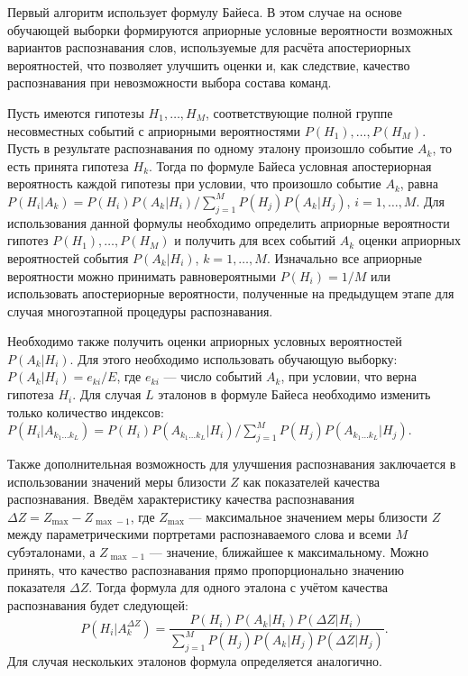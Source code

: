 Первый алгоритм использует формулу Байеса.
В этом случае на основе обучающей выборки формируются априорные условные вероятности возможных вариантов распознавания слов, используемые для расчёта апостериорных вероятностей, что позволяет улучшить оценки и, как следствие, качество распознавания при невозможности выбора состава команд.

Пусть имеются гипотезы $H_1, \dots, H_M$, соответствующие полной группе несовместных событий с априорными вероятностями $P(H_1), \dots, P(H_M)$.
Пусть в результате распознавания по одному эталону произошло событие $A_k$, то есть принята гипотеза $H_k$.
Тогда по формуле Байеса условная апостериорная вероятность каждой гипотезы при условии, что произошло событие $A_k$, равна $P(H_i|A_k) = P(H_i) P(A_k|H_i) / \sum_{j=1}^M P(H_j) P(A_k|H_j)$, $i = 1, \dots, M$.
Для использования данной формулы необходимо определить априорные вероятности гипотез $P(H_1), \dots, P(H_M)$ и получить для всех событий $A_k$ оценки априорных вероятностей события $P(A_k|H_i)$, $k = 1, \dots, M$.
Изначально все априорные вероятности можно принимать равновероятными $P(H_i) = 1/M$ или использовать апостериорные вероятности, полученные на предыдущем этапе для случая многоэтапной процедуры распознавания.

Необходимо также получить оценки априорных условных вероятностей $P(A_k|H_i)$.
Для этого необходимо использовать обучающую выборку: $P(A_k|H_i) = e_{ki} / E$, где $e_{ki}$ --- число событий $A_k$, при условии, что верна гипотеза $H_i$.
Для случая $L$ эталонов в формуле Байеса необходимо изменить только количество индексов: $P(H_i|A_{k_1 \dots k_L}) = P(H_i) P(A_{k_1 \dots k_L}|H_i) / \sum_{j=1}^M P(H_j) P(A_{k_1 \dots k_L}|H_j)$.

Также дополнительная возможность для улучшения распознавания заключается в использовании значений меры близости $Z$ как показателей качества распознавания.
Введём характеристику качества распознавания $\Delta Z = Z_{\max} - Z_{\max - 1}$, где $Z_{\max}$ --- максимальное значением меры близости $Z$ между параметрическими портретами распознаваемого слова и всеми $M$ субэталонами, а $Z_{\max - 1}$ --- значение, ближайшее к максимальному.
Можно принять, что качество распознавания прямо пропорционально значению показателя $\Delta Z$.
Тогда формула для одного эталона с учётом качества распознавания будет следующей:
\begin{equation}
P(H_i|A_k^{\Delta Z}) = \frac{P(H_i) P(A_k|H_i) P(\Delta Z|H_i)}{\sum_{j=1}^M P(H_j) P(A_k|H_j) P(\Delta Z|H_j)}.
\end{equation}
Для случая нескольких эталонов формула определяется аналогично.

